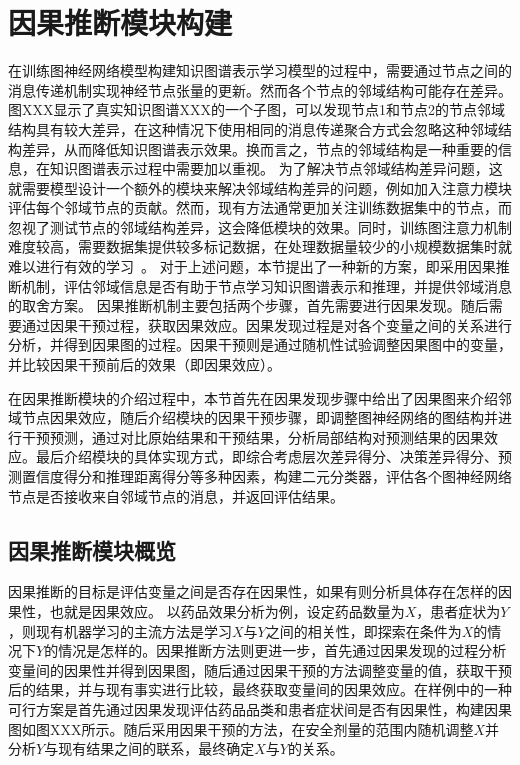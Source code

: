 \documentclass[algorithmlist, AutoFakeBold, AutoFakeSlant, figurelist, tablelist, nomlist, masters]{seuthesix}
\begin{document}
\section{因果推断模块构建}
在训练图神经网络模型构建知识图谱表示学习模型的过程中，需要通过节点之间的消息传递机制实现神经节点张量的更新。然而各个节点的邻域结构可能存在差异。图XXX显示了真实知识图谱XXX的一个子图，可以发现节点1和节点2的节点邻域结构具有较大差异，在这种情况下使用相同的消息传递聚合方式会忽略这种邻域结构差异，从而降低知识图谱表示效果。换而言之，节点的邻域结构是一种重要的信息，在知识图谱表示过程中需要加以重视。
为了解决节点邻域结构差异问题，这就需要模型设计一个额外的模块来解决邻域结构差异的问题，例如加入注意力模块评估每个邻域节点的贡献。然而，现有方法通常更加关注训练数据集中的节点，而忽视了测试节点的邻域结构差异，这会降低模块的效果。同时，训练图注意力机制难度较高，需要数据集提供较多标记数据，在处理数据量较少的小规模数据集时就难以进行有效的学习~\cite{knyazev2019understanding}。
对于上述问题，本节提出了一种新的方案，即采用因果推断机制，评估邻域信息是否有助于节点学习知识图谱表示和推理，并提供邻域消息的取舍方案。
因果推断机制主要包括两个步骤，首先需要进行因果发现。随后需要通过因果干预过程，获取因果效应。因果发现过程是对各个变量之间的关系进行分析，并得到因果图的过程。因果干预则是通过随机性试验调整因果图中的变量，并比较因果干预前后的效果（即因果效应）。

在因果推断模块的介绍过程中，本节首先在因果发现步骤中给出了因果图来介绍邻域节点因果效应，随后介绍模块的因果干预步骤，即调整图神经网络的图结构并进行干预预测，通过对比原始结果和干预结果，分析局部结构对预测结果的因果效应。最后介绍模块的具体实现方式，即综合考虑层次差异得分、决策差异得分、预测置信度得分和推理距离得分等多种因素，构建二元分类器，评估各个图神经网络节点是否接收来自邻域节点的消息，并返回评估结果。

\subsection{因果推断模块概览}
因果推断的目标是评估变量之间是否存在因果性，如果有则分析具体存在怎样的因果性，也就是因果效应。
以药品效果分析为例，设定药品数量为$X$，患者症状为$Y$，则现有机器学习的主流方法是学习$X$与$Y$之间的相关性，即探索在条件为$X$的情况下$Y$的情况是怎样的。因果推断方法则更进一步，首先通过因果发现的过程分析变量间的因果性并得到因果图，随后通过因果干预的方法调整变量的值，获取干预后的结果，并与现有事实进行比较，最终获取变量间的因果效应。在样例中的一种可行方案是首先通过因果发现评估药品品类和患者症状间是否有因果性，构建因果图如图XXX所示。随后采用因果干预的方法，在安全剂量的范围内随机调整$X$并分析$Y$与现有结果之间的联系，最终确定$X$与$Y$的关系。
\end{document}
